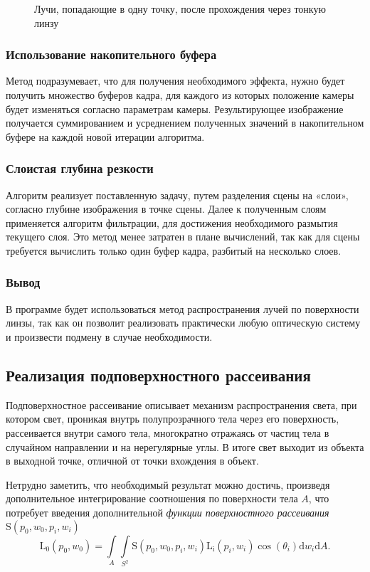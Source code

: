 \begin{figure}[h]
    \centering
    \def\svgwidth{0.6\textwidth}
    
    \caption{Лучи, попадающие в одну точку, после прохождения через тонкую
             линзу}
    \label{fig:lens}
\end{figure}

\subsubsection{Использование накопительного буфера}
Метод подразумевает, что для получения необходимого эффекта, нужно будет
получить множество буферов кадра, для каждого из которых положение камеры
будет изменяться согласно параметрам камеры. Результирующее изображение
получается суммированием и усреднением полученных значений в накопительном
буфере на каждой новой итерации алгоритма.

\subsubsection{Слоистая глубина резкости}
Алгоритм реализует поставленную задачу, путем разделения сцены на «слои»,
согласно глубине изображения в точке сцены. Далее к полученным слоям
применяется алгоритм фильтрации, для достижения необходимого размытия
текущего слоя. Это метод менее затратен в плане вычислений, так как для сцены
требуется вычислить только один буфер кадра, разбитый на несколько слоев.

\subsubsection*{Вывод}
В программе будет использоваться метод распространения лучей по
поверхности линзы, так как он позволит реализовать практически любую
оптическую систему и произвести подмену в случае необходимости.

\subsection{Реализация подповерхностного рассеивания}
Подповерхностное рассеивание описывает механизм распространения света,
при котором свет, проникая внутрь полупрозрачного тела через его поверхность,
рассеивается внутри самого тела, многократно отражаясь от частиц тела в
случайном направлении и на нерегулярные углы. В итоге свет выходит из объекта в
выходной точке, отличной от точки вхождения в объект.

Нетрудно заметить, что необходимый результат можно достичь, произведя
дополнительное интегрирование соотношения  по
поверхности тела $A$, что потребует введения дополнительной \emph{функции
поверхностного рассеивания} $\mathrm{S}(p_0, w_0, p_i, w_i)$
\begin{equation} \label{math:bssrdf_intensity}
    \mathrm{L_0} (p_0, w_0) = \int\limits_{A^{}} \int\limits_{{S^2}^{}}
                              \mathrm{S}(p_0, w_0, p_i, w_i)
                              \mathrm{L_i}(p_i, w_i) \cos(\theta_i)
                              \mathrm{d} w_i \mathrm{d} A.
\end{equation}

